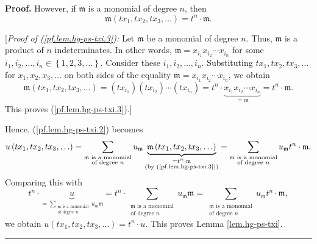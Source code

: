 \documentclass[numbers=enddot,12pt,final,onecolumn,notitlepage]{scrartcl}%
\theoremstyle{definition}
\newenvironment{proof}[1][Proof]{\noindent\textbf{#1.} }{\ \rule{0.5em}{0.5em}}
\let\sumnonlimits\sum
\renewcommand{\sum}{\sumnonlimits\limits}
\newenvironment{verlong}{}{}
\begin{document}
\begin{verlong}
\begin{proof}
However, if $\mathfrak{m}$ is a monomial of degree $n$, then%
\begin{equation}
\mathfrak{m}\left(  tx_{1},tx_{2},tx_{3},\ldots\right)  =t^{n}\cdot
\mathfrak{m}. \label{pf.lem.hg-ps-txi.3}%
\end{equation}


[\textit{Proof of (\ref{pf.lem.hg-ps-txi.3}):} Let $\mathfrak{m}$ be a
monomial of degree $n$. Thus, $\mathfrak{m}$ is a product of $n$
indeterminates. In other words, $\mathfrak{m}=x_{i_{1}}x_{i_{2}}\cdots
x_{i_{n}}$ for some $i_{1},i_{2},\ldots,i_{n}\in\left\{  1,2,3,\ldots\right\}
$. Consider these $i_{1},i_{2},\ldots,i_{n}$. Substituting $tx_{1}%
,tx_{2},tx_{3},\ldots$ for $x_{1},x_{2},x_{3},\ldots$ on both sides of the
equality $\mathfrak{m}=x_{i_{1}}x_{i_{2}}\cdots x_{i_{n}}$, we obtain%
\[
\mathfrak{m}\left(  tx_{1},tx_{2},tx_{3},\ldots\right)  =\left(  tx_{i_{1}%
}\right)  \left(  tx_{i_{2}}\right)  \cdots\left(  tx_{i_{n}}\right)
=t^{n}\cdot\underbrace{x_{i_{1}}x_{i_{2}}\cdots x_{i_{n}}}_{=\mathfrak{m}%
}=t^{n}\cdot\mathfrak{m}.
\]
This proves (\ref{pf.lem.hg-ps-txi.3}).]

Hence, (\ref{pf.lem.hg-ps-txi.2}) becomes%
\[
u\left(  tx_{1},tx_{2},tx_{3},\ldots\right)  =\sum_{\substack{\mathfrak{m}%
\text{ is a monomial}\\\text{of degree }n}}u_{\mathfrak{m}}%
\underbrace{\mathfrak{m}\left(  tx_{1},tx_{2},tx_{3},\ldots\right)
}_{\substack{=t^{n}\cdot\mathfrak{m}\\\text{(by (\ref{pf.lem.hg-ps-txi.3}))}%
}}=\sum_{\substack{\mathfrak{m}\text{ is a monomial}\\\text{of degree }%
n}}u_{\mathfrak{m}}t^{n}\cdot\mathfrak{m}.
\]
Comparing this with%
\[
t^{n}\cdot\underbrace{u}_{=\sum_{\substack{\mathfrak{m}\text{ is a
monomial}\\\text{of degree }n}}u_{\mathfrak{m}}\mathfrak{m}}=t^{n}\cdot
\sum_{\substack{\mathfrak{m}\text{ is a monomial}\\\text{of degree }%
n}}u_{\mathfrak{m}}\mathfrak{m}=\sum_{\substack{\mathfrak{m}\text{ is a
monomial}\\\text{of degree }n}}u_{\mathfrak{m}}t^{n}\cdot\mathfrak{m},
\]
we obtain $u\left(  tx_{1},tx_{2},tx_{3},\ldots\right)  =t^{n}\cdot u$. This
proves Lemma \ref{lem.hg-ps-txi}.
\end{proof}
\end{verlong}
\end{document}
